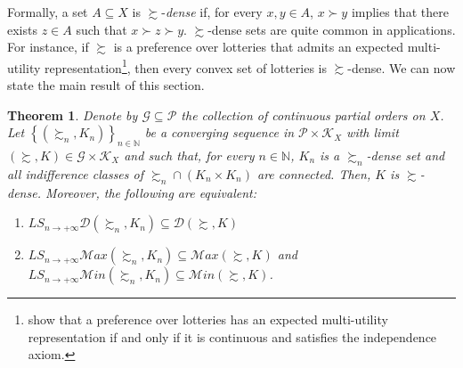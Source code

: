 \documentclass[12pt, oneside]{amsart}
\newtheorem{theorem}{Theorem}
\theoremstyle{definition}
\begin{document}
Formally, a set $A \subseteq X$ is $\succsim$-\textit{dense} if, for every $x,y \in A$, $x \succ y$ implies that there exists $z \in A$ such that $x \succ z \succ y$. $\succsim$-dense sets are quite common in applications. For instance, if $\succsim$ is a preference over lotteries that admits an expected multi-utility representation\footnote{\citet*{Dubra2004} show that a preference over lotteries has an expected multi-utility representation if and only if it is continuous and satisfies the independence axiom.}, then every convex set of lotteries is $\succsim$-dense. We can now state the main result of this section.

\begin{theorem}
	\label{th:full_maximum}
Denote by $\mathcal{G} \subseteq \mathcal{P}$ the collection of continuous partial orders on $X$. Let $\left\{\left(\succsim_n, K_n\right)\right\}_{n \in\mathbb{N}}$ be a converging sequence in $\mathcal{P} \times \mathcal{K}_X$ with limit $\left(\succsim, K\right) \in \mathcal{G} \times \mathcal{K}_X$ and such that, for every $n \in \mathbb{N}$, $K_n$ is a $\succsim_n$-dense set and all indifference classes of $\succsim_n \cap \left(K_n \times K_n\right)$ are connected. Then, $K$ is $\succsim$-dense. Moreover, the following are equivalent:
\begin{enumerate}
	\item $LS_{n \to +\infty} \mathcal{D}\left(\succsim_n, K_n\right) \subseteq \mathcal{D}\left(\succsim, K\right)$
	\item $LS_{n \to +\infty} \mathcal{M}ax(\succsim_n, K_n) \subseteq \mathcal{M}ax(\succsim, K)$ and \\$LS_{n \to +\infty} \mathcal{M}in(\succsim_n, K_n) \subseteq {\mathcal{M}in(\succsim, K)}$.
\end{enumerate}
\end{theorem}
\end{document}
